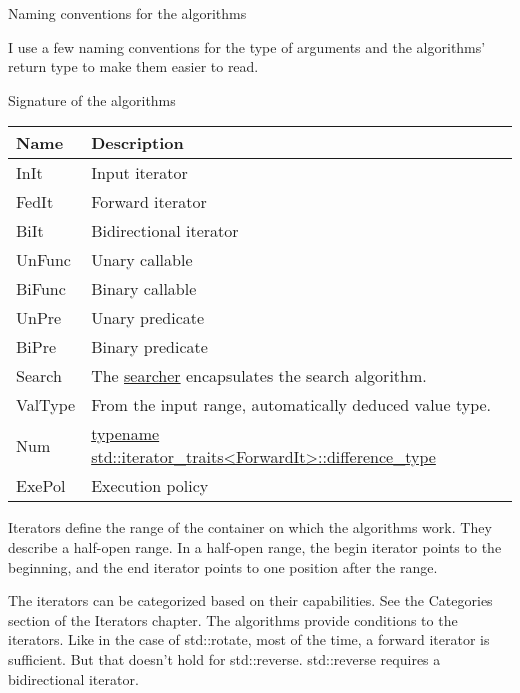 \begin{myNotic}{Naming conventions for the algorithms}

I use a few naming conventions for the type of arguments and the algorithms’ return type to make them easier to read.

\begin{center}
Signature of the algorithms
\end{center}

\begin{longtable}[c]{|l|l|}
\hline
\textbf{Name} & \textbf{Description}   \\ \hline
\endfirsthead
%
\endhead
%
InIt          & Input iterator         \\ \hline
FedIt         & Forward iterator       \\ \hline
BiIt          & Bidirectional iterator \\ \hline
UnFunc        & Unary callable         \\ \hline
BiFunc        & Binary callable        \\ \hline
UnPre         & Unary predicate        \\ \hline
BiPre         & Binary predicate       \\ \hline
Search  & The \href{https://en.cppreference.com/w/cpp/algorithm/search}{searcher} encapsulates the search algorithm.                                    \\ \hline
ValType & From the input range, automatically deduced value type.                            \\ \hline
Num     & \href{https://en.cppreference.com/w/cpp/iterator/iterator_traits}{typename std::iterator\_traits\textless{}ForwardIt\textgreater{}::difference\_type} \\ \hline
ExePol        & Execution policy       \\ \hline
\end{longtable}

\end{myNotic}


Iterators define the range of the container on which the algorithms work. They describe a half-open range. In a half-open range, the begin iterator points to the beginning, and the end iterator points to one position after the range.

The iterators can be categorized based on their capabilities. See the Categories section of the Iterators chapter. The algorithms provide conditions to the iterators. Like in the case of std::rotate, most of the time, a forward iterator is sufficient. But that doesn’t hold for std::reverse. std::reverse requires a bidirectional iterator.









